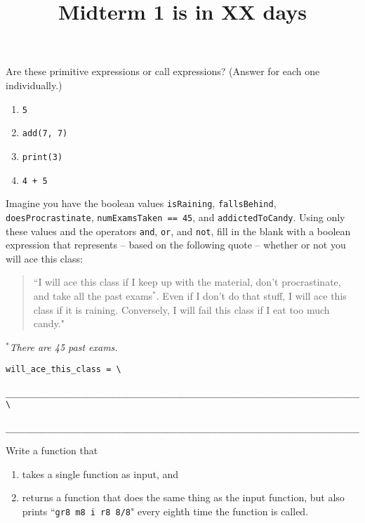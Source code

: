 \documentclass[twoside]{article}
\title{\sc Midterm 1 is in XX days}
\begin{document}
\maketitle

\begin{enumerate}

Are these primitive expressions or call expressions? (Answer for each one individually.)
\begin{enumerate}
\item \texttt{5}
\item \texttt{add(7, 7)}
\item \texttt{print(3)}
\item \texttt{4 + 5}
\end{enumerate}


Imagine you have the boolean values \texttt{isRaining}, \texttt{fallsBehind}, \texttt{doesProcrastinate}, \texttt{numExamsTaken == 45}, and \texttt{addictedToCandy}. Using only these values and the operators \texttt{and}, \texttt{or}, and \texttt{not}, fill in the blank with a boolean expression that represents -- based on the following quote -- whether or not you will ace this class:

\begin{quote}
``I will ace this class if I keep up with the material, don't procrastinate, and take all the past exams$^*$. Even if I don't do that stuff, I will ace this class if it is raining. Conversely, I will fail this class if I eat too much candy."
\end{quote}

\hfill $^*$\textit{There are 45 past exams.}

\begin{lstlisting}
will_ace_this_class = \

________________________________________________________________________ \

__________________________________________________________________________
\end{lstlisting}


Write a function that
\begin{enumerate}
\item takes a single function as input, and
\item returns a function that does the same thing as the input function, but also prints ``\texttt{gr8 m8 i r8 8/8}" every eighth time the function is called.
\end{enumerate}


\end{enumerate}
\end{document}
